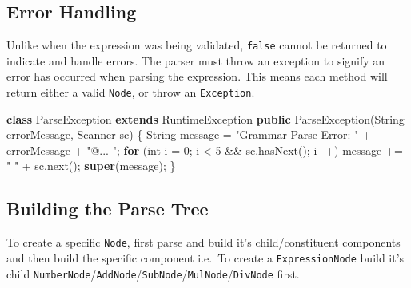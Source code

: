 \documentclass[
]{book}
\newenvironment{Shaded}{\begin{snugshade}}{\end{snugshade}}
\newcommand{\BuiltInTok}[1]{#1}
\newcommand{\DataTypeTok}[1]{\textcolor[rgb]{0.13,0.29,0.53}{#1}}
\newcommand{\DecValTok}[1]{\textcolor[rgb]{0.00,0.00,0.81}{#1}}
\newcommand{\FunctionTok}[1]{\textcolor[rgb]{0.00,0.00,0.00}{#1}}
\newcommand{\KeywordTok}[1]{\textcolor[rgb]{0.13,0.29,0.53}{\textbf{#1}}}
\newcommand{\NormalTok}[1]{#1}
\newcommand{\StringTok}[1]{\textcolor[rgb]{0.31,0.60,0.02}{#1}}
\begin{document}
\hypertarget{error-handling}{%
\subsection{Error Handling}\label{error-handling}}

Unlike when the expression was being validated, \texttt{false} cannot be returned to indicate and {handle errors}. The parser must {throw an exception} to signify an error has occurred when parsing the expression. This means each method will return either a valid \texttt{Node}, or throw an \texttt{Exception}.

\begin{Shaded}
\begin{Highlighting}[]
\KeywordTok{class} \BuiltInTok{ParseException} \KeywordTok{extends} \BuiltInTok{RuntimeException}
  \KeywordTok{public} \BuiltInTok{ParseException}\NormalTok{(}\BuiltInTok{String}\NormalTok{ errorMessage, }\BuiltInTok{Scanner}\NormalTok{ sc) \{}
    \BuiltInTok{String}\NormalTok{ message = }\StringTok{"Grammar Parse Error: "}\NormalTok{ + errorMessage + }\StringTok{"@... "}\NormalTok{;}
    \KeywordTok{for}\NormalTok{ (}\DataTypeTok{int}\NormalTok{ i = }\DecValTok{0}\NormalTok{; i \textless{} }\DecValTok{5}\NormalTok{ \&\& sc.}\FunctionTok{hasNext}\NormalTok{(); i++)}
\NormalTok{      message += }\StringTok{" "}\NormalTok{ + sc.}\FunctionTok{next}\NormalTok{();}
    \KeywordTok{super}\NormalTok{(message);}
\NormalTok{  \}}
\end{Highlighting}
\end{Shaded}

\hypertarget{building-the-parse-tree}{%
\subsection{Building the Parse Tree}\label{building-the-parse-tree}}

To create a specific \texttt{Node}, first parse and build it's child/constituent components and then build the specific component i.e.~To create a \texttt{ExpressionNode} build it's child \texttt{NumberNode}/\texttt{AddNode}/\texttt{SubNode}/\texttt{MulNode}/\texttt{DivNode} first.
\end{document}
